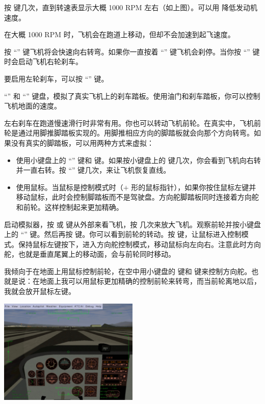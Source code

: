 按  键几次，直到转速表显示大概 1000 RPM 左右（如上图）。可以用  降低发动机速度。

在大概 1000 RPM 时，飞机会在跑道上移动，但却不会加速到起飞速度。

按 “” 键飞机将会快速向右转弯。如果你一直按着 “” 键飞机会刹停。当你按 “” 键时会启动飞机右轮刹车。

要启用左轮刹车，可以按 “\key{,}” 键。

“\key{,}” 和 “” 键盘，模拟了真实飞机上的刹车踏板。使用油门和刹车踏板，你可以控制飞机地面的速度。

左右刹车在跑道慢速滑行时非常有用。你也可以转动飞机前轮。在真实中，飞机前轮是通过用脚推脚踏板实现的。用脚推相应方向的脚踏板就会向那个方向转弯。如果没有真实的脚踏板，可以用两种方式来虚拟：
\begin{itemize}
    \item 使用小键盘上的 “” 键和  键。如果按小键盘上的  键几次，你会看到飞机向右转并一直右转。按 “” 键几次，来让飞机恢复直线。
    \item 使用鼠标。当鼠标是控制模式时（$+$ 形的鼠标指针），如果你按住鼠标左键并移动鼠标，此时会控制脚踏板而不是驾驶盘。方向舵脚踏板同时连接着方向舵和前轮。这样控制起来更加精确。
\end{itemize}

启动模拟器，按  或  键从外部来看飞机，按  几次来放大飞机。观察前轮并按小键盘上的 “” 键。然后再按  键。你可以看到前轮的转动。按  键，让鼠标进入控制模式。保持鼠标左键按下，进入方向舵控制模式，移动鼠标向左向右。注意此时方向舵，也就是垂直尾翼上的移动面，会与前轮同时移动。

我倾向于在地面上用鼠标控制前轮，在空中用小键盘的  键和  键来控制方向舵。也就是说：在地面上我可以用鼠标更加精确的控制前轮来转弯，而当前轮离地以后，我就会放开鼠标左键。

\begin{center}
\includegraphics[width=0.5\textwidth]{img/tut_23}
\end{center}


